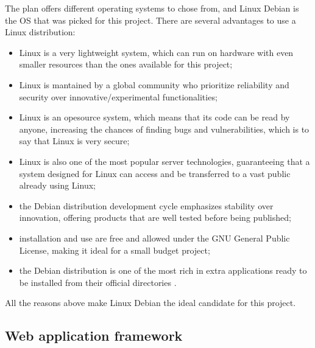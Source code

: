 The plan offers different operating systems to chose from, and Linux Debian is
the OS that was picked for this project. There are several advantages to use a
Linux distribution:
\begin{itemize}
  \item Linux is a very lightweight system, which can run on hardware with even
  smaller resources than the ones available for this project;
  \item Linux is mantained by a global community who prioritize reliability and
  security over innovative/experimental functionalities;
  \item Linux is an opesource system, which means that its code can be read by
  anyone, increasing the chances of finding bugs and vulnerabilities, which is
  to say that Linux is very secure;
  \item Linux is also one of the most popular server technologies, guaranteeing
  that a system designed for Linux can access and be transferred to a vast
  public already using Linux;
  \item the Debian distribution development cycle emphasizes stability over
  innovation, offering products that are well tested before being published;
  \item installation and use are free and allowed under the GNU General Public
  License, making it ideal for a small budget project;
  \item the Debian distribution is one of the most rich in extra applications
  ready to be installed from their official directories \cite{Debian}.
\end{itemize}

All the reasons above make Linux Debian the ideal candidate for this project.

\subsection{Web application framework}


